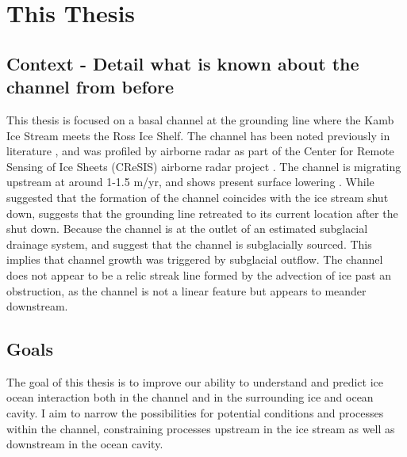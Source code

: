 \section{This Thesis}
\subsection{Context - Detail what is known about the channel from before
}

This thesis is focused on a basal channel at the grounding line where the Kamb Ice Stream meets the Ross Ice Shelf. The channel has been noted previously in literature \citep{alley2016impacts,kim2016active,goeller2015subglacial,horgan2017poststagnation}, and was profiled by airborne radar as part of the Center for Remote Sensing of Ice Sheets (CReSIS) airborne radar project \citep{arnold2020cresis}. The channel is migrating upstream at around 1-1.5 m/yr, and shows present surface lowering \citep{kim2016active}. While \cite{kim2016active} suggested that the formation of the channel coincides with the ice stream shut down,   \cite{horgan2017poststagnation} suggests that the grounding line retreated to its current location after the shut down. Because the channel is at the outlet of an estimated subglacial drainage system, \cite{alley2016impacts} and \cite{kim2016active} suggest that the channel is subglacially sourced. This implies that channel growth was triggered by subglacial outflow. The channel does not appear to be a relic streak line formed by the advection of ice past an obstruction, as the channel is not a linear feature but appears to meander downstream.


 
\subsection{Goals} \label{sec:objectives}

The goal of this thesis is to improve our ability to understand and predict ice ocean interaction both in the channel and in the surrounding ice and ocean cavity. I aim to narrow the possibilities for potential conditions and processes within the channel, constraining processes upstream in the ice stream as well as downstream in the ocean cavity. 

